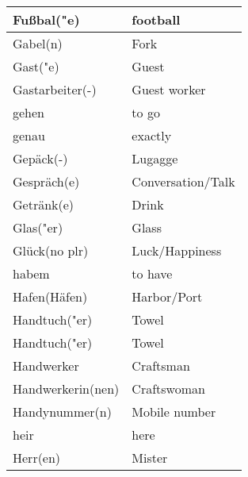 \documentclass{article}
\begin{document}
\begin{minipage}{0.48\textwidth}
\begin{tabular}{|>{\raggedright\arraybackslash}p{3.5cm}|>{\raggedright\arraybackslash}p{3.5cm}|}
        Fu\ss{}bal("e) & football \\\hline
        Gabel(n) & Fork \\\hline
        Gast("e) & Guest \\\hline
        Gastarbeiter(-) & Guest worker \\\hline
        gehen & to go \\\hline
        genau & exactly \\\hline
        Gepäck(-) & Lugagge \\\hline
        Gespräch(e) & Conversation/Talk \\\hline
        Getränk(e) & Drink \\\hline
        Glas("er) & Glass \\\hline
        Glück(no plr) & Luck/Happiness \\\hline
        habem & to have \\\hline
        Hafen(Häfen) & Harbor/Port \\\hline
        Handtuch("er) & Towel \\\hline
        Handtuch("er) & Towel \\\hline
        Handwerker & Craftsman \\\hline
        Handwerkerin(nen) & Craftswoman \\\hline
        Handynummer(n) & Mobile number \\\hline
        heir & here \\\hline
        Herr(en) & Mister \\\hline
    \end{tabular}
\end{minipage}

\newpage
\end{document}
